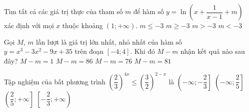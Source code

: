 \begin{ex}%
	Tìm tất cả các giá trị thực của tham số $m$ để hàm số $y=\ln \left(x+\dfrac{1}{x-1}+m\right)$ xác định với mọi $x$ thuộc khoảng $\left(1;+\infty\right)$.
	\choice
	{$m\le-3$}
	{$m\ge-3$} 	
	{\True $m>-3$} 	
	{$m<-3$}
\end{ex}

\begin{ex}%
	Gọi $M$, $m$ lần lượt là giá trị lớn nhất, nhỏ nhất của hàm số $y=x^3-3x^2-9x+35$ trên đoạn $\left[-4;4\right]$. Khi đó $M-m$ nhận kết quả nào sau đây?
	\choice
	{$M-m=1$}
	{$M-m=86$}	
	{$M-m=76$}	
	{\True $M-m=81$}
\end{ex}

\begin{ex}%
	Tập nghiệm của bất phương trình $\left(\dfrac{2}{3}\right)^{4x}\le \left(\dfrac{3}{2}\right)^{2-x}$ là
	\choice
	{$\left(-\infty;-\dfrac{2}{3}\right]$}
	{$\left(-\infty;\dfrac{2}{5}\right]$}	
	{$\left(\dfrac{2}{5};+\infty\right]$}	
	{\True $\left[-\dfrac{2}{3};+\infty\right)$}
\end{ex}

